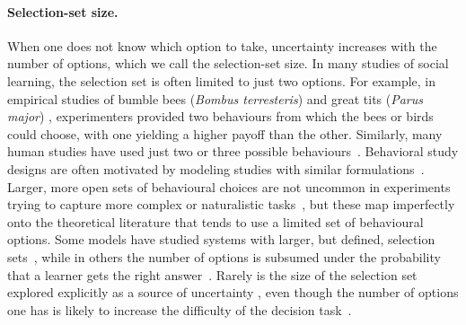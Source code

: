 \documentclass[letterpaper,11.5pt]{scrartcl}
\newcommand{\mt}[1]{{\textcolor{myorange} {({\tiny MT:} #1)}}}
\begin{document}
\paragraph{Selection-set size.}
When one does not know which option to take, uncertainty increases with the number of options, which we call the selection-set size.
In many studies of social learning, the selection set is often limited to just two options.  For example, in empirical studies of bumble bees (\emph{Bombus
terresteris}) \citep{Baracchi2018} and great tits (\emph{Parus major}) \citep{Aplin2017}, experimenters provided two behaviours from which the bees or birds
could choose, with one yielding a higher payoff than the other. %
Similarly, many human studies have used just two or three possible
behaviours~\citep{McElreath2005,Morgan2012, Toyokawa2019}. Behavioral study designs are
often motivated by modeling studies with similar formulations~\citep{Rogers1988,boyd1995does,Feldman1996,
perreault2012bayesian}.
Larger, more open sets of behavioural choices are not uncommon in experiments trying to capture more complex or naturalistic tasks~\citep{derex2013, wasielewski2014}, but these map imperfectly onto the theoretical literature that tends to use a limited set of behavioural options.
Some models have studied systems with larger, but defined, selection sets~\citep{Rendell2010, lindstrom2016co}, while in others the number of options is subsumed under the probability that a learner gets the right  answer~\citep{Feldman1996,Enquist2007}.
Rarely is the size of the selection set explored explicitly as a source of  uncertainty \citep[though see][]{Muthukrishna2016a}, even though the number of options one has is likely to increase the difficulty of the decision task~\citep{haynes2009testing,white2009testing}.  
\end{document}
